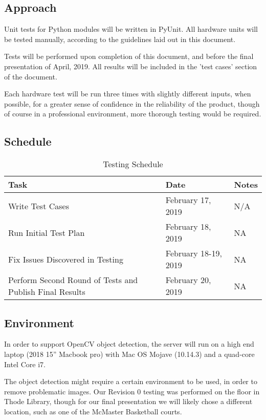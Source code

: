 \documentclass[11pt]{article}
\begin{document}
\subsection{Approach}
Unit tests for Python modules will be written in PyUnit. All hardware units will be tested manually, according to the guidelines laid out in this document.

Tests will be performed upon completion of this document, and before the final presentation of April, 2019. All results will be included in the 'test cases' section of the document.

Each hardware test will be run three times with slightly different inputs, when possible, for a greater sense of confidence in the reliability of the product, though of course in a professional environment,
more thorough testing would be required.

\subsection{Schedule}
\begin{table}[H]
\centering
\label{my-label}
\begin{tabular}{|l|l|l|}
\hline
\textbf{Task} & \textbf{Date} & \textbf{Notes} \\ \hline
Write Test Cases & February 17, 2019 & N/A \\ \hline
Run Initial Test Plan & February 18, 2019 & NA \\ \hline
Fix Issues Discovered in Testing & February 18-19, 2019 & NA \\ \hline
Perform Second Round of Tests and Publish Final Results & February 20, 2019 & NA \\ \hline
\end{tabular}

\caption{Testing Schedule}
\end{table}
\subsection{Environment}
In order to support OpenCV object detection, the server will run on a high end laptop (2018 15'' Macbook pro) with Mac OS Mojave (10.14.3) and a quad-core Intel Core i7.

The object detection might require a certain environment to be used, in order to remove problematic images. Our Revision 0 testing was performed on the floor in Thode Library, though
for our final presentation we will likely chose a different location, such as one of the McMaster Basketball courts.
\end{document}
